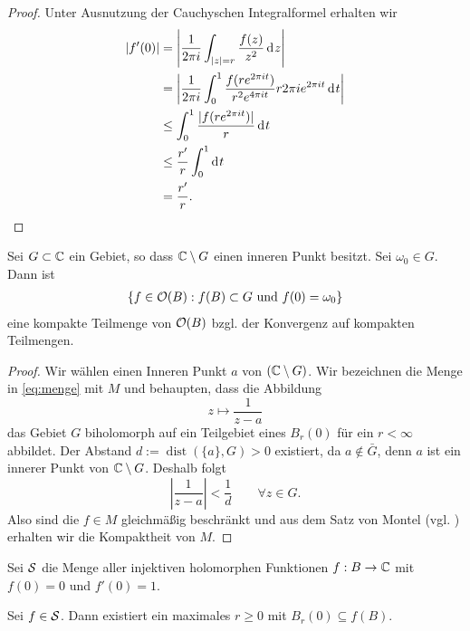 \begin{proof}
  Unter Ausnutzung der Cauchyschen Integralformel erhalten wir
  \begin{align*}
    |f'(0)| & = \left | \frac{1}{2\pi i} \int_{|z| = r} \frac{f(z)}{z^2}
      \d[z] \right | \\
    & = \left | \frac{1}{2 \pi i} \int_0^1 \frac{f(r e^{2\pi it})}{r^2
        e^{4\pi i t}} r 2\pi i e^{2\pi i t} \d[t] \right | \\
    & \leq \int_0^1 \frac{|f(r e^{2\pi it})|}{r} \d[t] \\
    & \leq \frac{r'}{r} \int_0^1 \d[t] \\
    & = \frac{r'}{r}.
  \end{align*}
\end{proof}

\begin{lemma}
  \label{lemma:funktion-kompakt}
  Sei $G \subset \C$ ein Gebiet, so dass $\C\setminus G$ einen inneren
  Punkt besitzt. Sei $\omega_0 \in G$. Dann ist
  \begin{align}
  \{f \in \hol(B): f(B) \subset G \text{ und } f(0) = \omega_0
  \} \label{eq:menge} 
  \end{align}
  eine kompakte Teilmenge von $\hol(B)$ bzgl. der Konvergenz auf
  kompakten Teilmengen.
\end{lemma}

\begin{proof}
  Wir wählen einen Inneren Punkt $a$ von $(\C \setminus G)$. Wir bezeichnen die
  Menge in  \eqref{eq:menge} mit $M$ und behaupten, dass die Abbildung
  \[
  z \mapsto \frac{1}{z-a}
  \]
  das Gebiet $G$ biholomorph auf ein Teilgebiet eines
  $B_r(0)$ für ein $r < \infty$ abbildet. 
  Der Abstand $d:= \operatorname{dist}(\{a\},G)> 0$ existiert, da $a \notin \bar
  G$, denn $a$ ist ein innerer Punkt von $\C \setminus G$. Deshalb
  folgt
  \[
  \left | \frac{1}{z-a} \right |< \frac1d \qquad \forall z \in G.
  \]
  Also sind die $f \in M$ gleichmäßig beschränkt und aus dem Satz von
  Montel (vgl. \cite[Satz 4.9]{Frei}) erhalten wir die Kompaktheit von $M$.
\end{proof}

\begin{defin}
  Sei $\S$\index{$\S$} die Menge aller injektiven holomorphen Funktionen $f: B \ra
  \C$ mit $f(0) = 0$ und $f'(0)= 1$.
\end{defin}

\begin{lemma}
  \label{lemma:schlicht-max-rad}
  Sei $f \in \S$. Dann existiert ein maximales $r \geq 0$ mit $B_r(0) \subseteq
  f(B)$.
\end{lemma}

